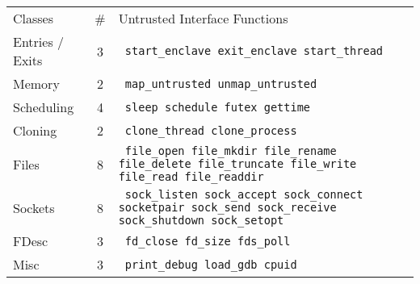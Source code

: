 \footnotesize
\begin{tabular}{lcp{4.5in}}
\hline
\addlinespace
Classes & \# & Untrusted Interface Functions \\
\addlinespace
\hline
Entries / Exits & 3 & {\tt
start\_enclave
exit\_enclave
start\_thread
} \\
\hline
Memory & 2 & {\tt
map\_untrusted
unmap\_untrusted
} \\
\hline
Scheduling & 4 & {\tt
sleep
schedule
futex
gettime
} \\
\hline
Cloning & 2 & {\tt
clone\_thread
clone\_process
} \\
\hline
Files & 8 & {\tt
file\_open
file\_mkdir
file\_rename
file\_delete
file\_truncate
file\_write
file\_read
file\_readdir
} \\
\hline
Sockets & 8 & {\tt
sock\_listen
sock\_accept
sock\_connect
socketpair
sock\_send
sock\_receive
sock\_shutdown
sock\_setopt
} \\
\hline
FDesc & 3 & {\tt
fd\_close
fd\_size
fds\_poll
} \\
\hline
Misc & 3 & {\tt
print\_debug
load\_gdb
cpuid
} \\
\hline
\end{tabular}
